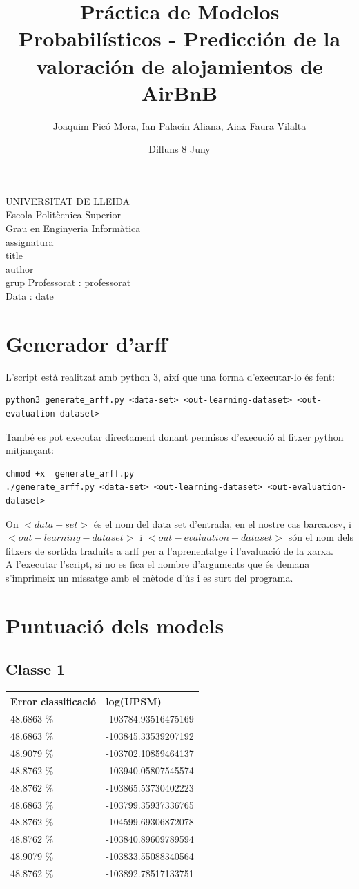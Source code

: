\documentclass{article}
\title{Práctica de Modelos Probabilísticos - Predicción de la valoración de alojamientos de AirBnB}
\author{Joaquim Picó Mora, Ian Palacín Aliana, Aiax Faura Vilalta}
\date{Dilluns 8 Juny}
\renewcommand{\maketitle}{ %
	\begin{titlepage}
		\raggedright{UNIVERSITAT DE LLEIDA \\
			Escola Politècnica Superior \\
			Grau en Enginyeria Informàtica\\
			\1assignatura\\}
		\vspace{5cm}
		\centering\huge{\5title \\}
		\vspace{3cm}
		\large{\6author} \\
		\normalsize{\3grup}
		\vfill
		Professorat : \4professorat \\
		Data : \7date
\end{titlepage}}
\begin{document}
	\maketitle
	\thispagestyle{empty}


\section{Generador d'arff}	
L'script està realitzat amb python 3, així que una forma d'executar-lo és fent:
\begin{verbatim}
python3 generate_arff.py <data-set> <out-learning-dataset> <out-evaluation-dataset>
\end{verbatim}
També es pot executar directament donant permisos d'execució al fitxer python mitjançant:
\begin{verbatim}
chmod +x  generate_arff.py
./generate_arff.py <data-set> <out-learning-dataset> <out-evaluation-dataset>
\end{verbatim}
On $<data-set>$ és el nom del data set d'entrada, en el nostre cas barca.csv, i $<out-learning-dataset>$ i $<out-evaluation-dataset>$ són el nom dels fitxers de sortida traduits a arff per a l'aprenentatge i l'avaluació de la xarxa.\\
A l'executar l'script, si no es fica el nombre d'arguments que és demana s'imprimeix un missatge amb el mètode d'ús i es surt del programa. 
\section{Puntuació dels models}
\subsection{Classe 1}
\begin{table}[H]
\begin{tabular}{ll}
\hline
Error classificació & log(UPSM)           \\
\hline
48.6863 \%          & -103784.93516475169 \\
48.6863 \%          & -103845.33539207192 \\
48.9079 \%          & -103702.10859464137 \\
48.8762 \%          & -103940.05807545574 \\
48.8762 \%          & -103865.53730402223 \\
48.6863 \%          & -103799.35937336765 \\
48.8762 \%          & -104599.69306872078 \\
48.8762 \%          & -103840.89609789594 \\
48.9079 \%          & -103833.55088340564 \\
48.8762 \%          & -103892.78517133751
\end{tabular}
\end{table}
\end{document}
